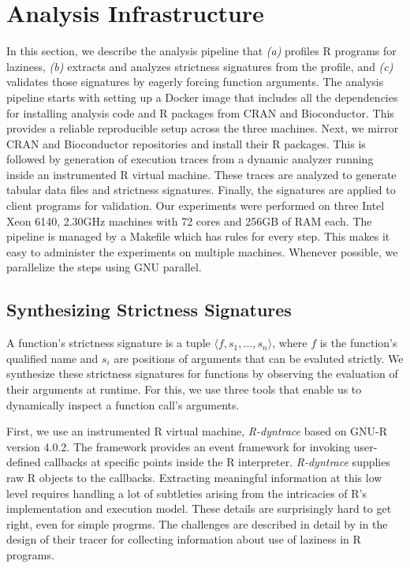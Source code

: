 \documentclass[screen,acmsmall]{acmart}
\begin{document}
\section{Analysis Infrastructure}
In this section, we describe the analysis pipeline that \emph{(a)} profiles R
programs for laziness, \emph{(b)} extracts and analyzes strictness signatures
from the profile, and \emph{(c)} validates those signatures by eagerly forcing
function arguments. The analysis pipeline starts with setting up a Docker image
that includes all the dependencies for installing analysis code and R packages
from CRAN and Bioconductor. This provides a reliable reproducible setup across
the three machines. Next, we mirror CRAN and Bioconductor\cite{bioc} repositories and
install their R packages. This is followed by generation of execution traces
from a dynamic analyzer running inside an instrumented R virtual machine. These
traces are analyzed to generate tabular data files and strictness signatures.
Finally, the signatures are applied to client programs for validation. Our
experiments were performed on three Intel Xeon 6140, 2.30GHz machines with 72
cores and 256GB of RAM each. The pipeline is managed by a Makefile which has
rules for every step. This makes it easy to administer the experiments on
multiple machines. Whenever possible, we parallelize the steps using GNU
parallel\cite{tange2011a}.

\subsection{Synthesizing Strictness Signatures}

A function's strictness signature is a tuple $\langle f, s_1, ..., s_n
\rangle$, where $f$ is the function's qualified name and $s_i$ are positions of arguments that can be
evaluted strictly. We synthesize these strictness signatures for functions by
observing the evaluation of their arguments at runtime. For this, we use three
tools that enable us to dynamically inspect a function call's arguments.


First,
we use an instrumented R virtual machine, \emph{R-dyntrace} \citet{oopsla19b}
based on GNU-R version 4.0.2. The framework provides an event framework for
invoking user-defined callbacks at specific points inside the R interpreter.
\emph{R-dyntrace} supplies raw R objects to the callbacks. Extracting meaningful
information at this low level requires handling a lot of subtleties arising from
the intricacies of R's implementation and execution model. These details are
surprisingly hard to get right, even for simple progrms. The challenges are
described in detail by \cite{oopsla19b} in the design of their tracer for
collecting information about use of laziness in R programs.
\end{document}
